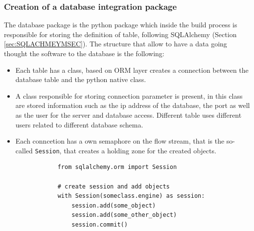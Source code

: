 \documentclass[../main.tex]{subfiles}
\begin{document}
\subsubsection{Creation of a database integration package}
The database package is the python package which inside the build process is responsible for storing the definition of table, following SQLAlchemy (Section \ref{sec:SQLACHMEYMSEC}).
The structure that allow to have a data going thought the software to the database is the following:
\begin{itemize}
    \item Each table has a class, based on \gls{ORM} layer creates a connection between the database table and the python native class. 
    \item A class responsible for storing connection parameter is present, in this class are stored information such as the ip address of the database, the port as well as the user for the server and database access. Different table uses different users related to different database schema. 
    \item Each conncetion has a own semaphore on the flow stream, that is the so-called \texttt{Session}, that creates a holding zone for the created objects. 
        \lstset{language=Python}
        \lstset{frame=lines}
        \lstset{basicstyle=\footnotesize}
        \begin{lstlisting}
            from sqlalchemy.orm import Session
            
            # create session and add objects
            with Session(someclass.engine) as session:
                session.add(some_object)
                session.add(some_other_object)
                session.commit()
        \end{lstlisting}
\end{itemize}
\end{document}
